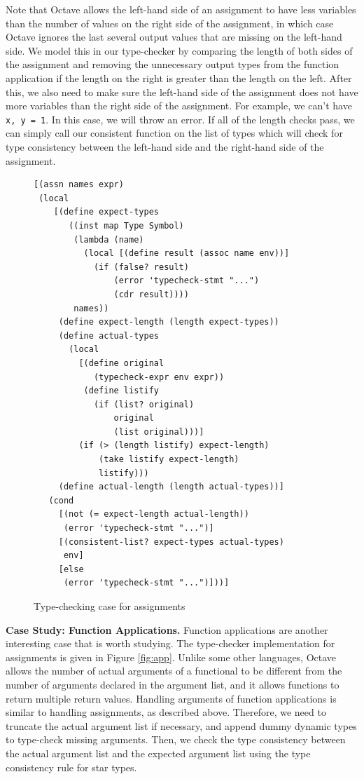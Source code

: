 Note that Octave allows the left-hand side of an assignment to have less variables than the number of values on the right side of the assignment, in which case Octave ignores the last several output values that are missing on the left-hand side. We model this in our type-checker by comparing the length of both sides of the assignment and removing the unnecessary output types from the function application if the length on the right is greater than the length on the left. After this, we also need to make sure the left-hand side of the assignment does not have more variables than the right side of the assignment. For example, we can't have {\tt x, y = 1}. In this case, we will throw an error. If all of the length checks pass, we can simply call our consistent function on the list of types which will check for type consistency between the left-hand side and the right-hand side of the assignment.  

\begin{figure}[h]
    \begin{lstlisting}[language=racket]
[(assn names expr)
 (local
    [(define expect-types
       ((inst map Type Symbol)
        (lambda (name)
          (local [(define result (assoc name env))]
            (if (false? result)
                (error 'typecheck-stmt "...")
                (cdr result))))
        names))
     (define expect-length (length expect-types))
     (define actual-types
       (local
         [(define original
            (typecheck-expr env expr))
          (define listify
            (if (list? original)
                original
                (list original)))]
         (if (> (length listify) expect-length)
             (take listify expect-length)
             listify)))
     (define actual-length (length actual-types))]
   (cond
     [(not (= expect-length actual-length))
      (error 'typecheck-stmt "...")]
     [(consistent-list? expect-types actual-types)
      env]
     [else
      (error 'typecheck-stmt "...")]))]
    \end{lstlisting}
    \caption[]{Type-checking case for assignments}
    \label{fig:assn}
\end{figure}


{\bf Case Study: Function Applications.} Function applications are another interesting case that is worth studying. The type-checker implementation for assignments is given in Figure \ref{fig:app}. Unlike some other languages, Octave allows the number of actual arguments of a functional to be different from the number of arguments declared in the argument list, and it allows functions to return multiple return values. Handling arguments of function applications is similar to handling assignments, as described above. Therefore, we need to truncate the actual argument list if necessary, and append dummy dynamic types to type-check missing arguments. Then, we check the type consistency between the actual argument list and the expected argument list using the type consistency rule for star types.


